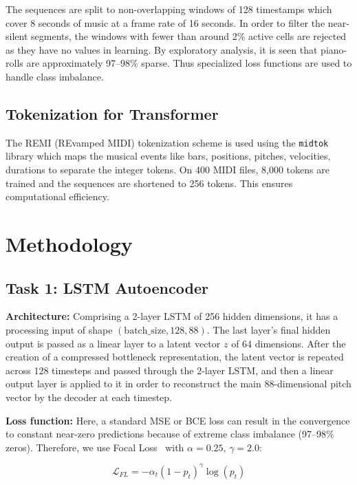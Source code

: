\documentclass[conference]{IEEEtran}
\begin{document}
The sequences are split to non-overlapping windows of 128 timestamps which cover 8 seconds of music at a frame rate of 16 seconds. In order to filter the near-silent segments, the windows with fewer than around 2\% active cells are rejected as they have no values in learning. By exploratory analysis, it is seen that piano-rolls are approximately 97--98\% sparse. Thus specialized loss functions are used to handle class imbalance.

\subsection{Tokenization for Transformer}

The REMI (REvamped MIDI) tokenization scheme is used using the \texttt{midtok} library which maps the musical events like bars, positions, pitches, velocities, durations to separate the integer tokens. On 400 MIDI files, 8,000 tokens are trained and the sequences are shortened to 256 tokens. This ensures computational efficiency.

\section{Methodology}

\subsection{Task 1: LSTM Autoencoder}

\textbf{Architecture:} Comprising a 2-layer LSTM of 256 hidden dimensions, it has a processing input of shape $(\text{batch\_size}, 128, 88)$. The last layer's final hidden output is passed as a linear layer to a latent vector $z$ of 64 dimensions. After the creation of a compressed bottleneck representation, the latent vector is repeated across 128 timesteps and passed through the 2-layer LSTM, and then a linear output layer is applied to it in order to reconstruct the main 88-dimensional pitch vector by the decoder at each timestep.

\textbf{Loss function:} Here, a standard MSE or BCE loss can result in the convergence to constant near-zero predictions because of extreme class imbalance (97--98\% zeros). Therefore, we use Focal Loss~\cite{ref7} with $\alpha=0.25$, $\gamma=2.0$:

\begin{equation}
\mathcal{L}_{FL} = -\alpha_t (1-p_t)^\gamma \log(p_t)
\end{equation}
\end{document}

